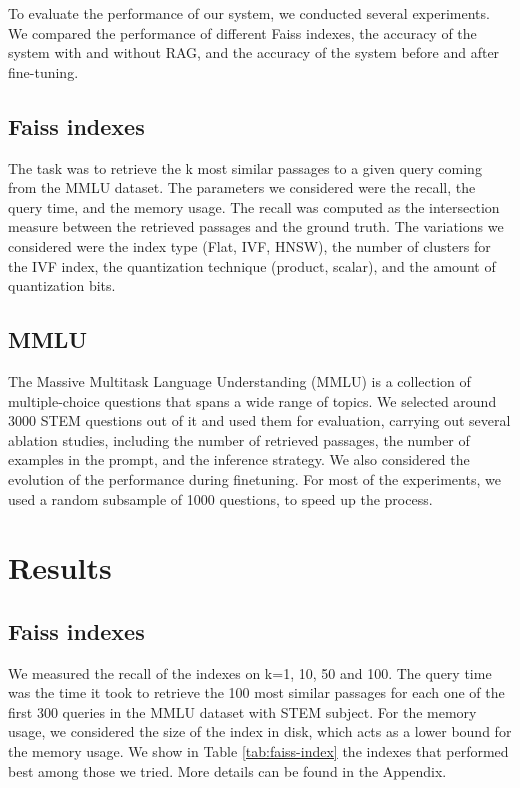 \documentclass[11pt]{article}
\begin{document}
To evaluate the performance of our system, we conducted several experiments.
We compared the performance of different Faiss indexes, the accuracy of the system with and without RAG,
and the accuracy of the system before and after fine-tuning.

\subsection{Faiss indexes}

The task was to retrieve the k most similar passages to a
given query coming from the MMLU dataset.
The parameters we considered were the recall, the query time, 
and the memory usage. 
The recall was computed as the intersection measure between the retrieved 
passages and the ground truth. 
The variations we considered were the index type (Flat, IVF, HNSW), the number 
of clusters for the IVF index, the quantization technique (product, scalar), and
the amount of quantization bits.

\subsection{MMLU}

The Massive Multitask Language Understanding (MMLU) \cite{mmlu_hf} is a collection of 
multiple-choice questions that spans a wide range of topics. We selected around 3000 STEM questions out of it
and used them for evaluation, carrying out several ablation studies, including the number of retrieved passages,
the number of examples in the prompt, and the inference strategy. We also considered the evolution of the performance during finetuning.
For most of the experiments, we used a random subsample of 1000 questions, to speed up the process.

\section{Results}

\subsection{Faiss indexes}

We measured the recall of the indexes on k=1, 10, 50 and 100. The query time was 
the time it took to retrieve the 100 most similar passages for each one of the first 300
queries in the MMLU dataset with STEM subject. 
For the memory usage, we considered the size of the index in disk, which acts as a lower
bound for the memory usage.
We show in Table \ref{tab:faiss-index} the indexes that performed best among those we tried. More details can be found in the Appendix.
\end{document}
